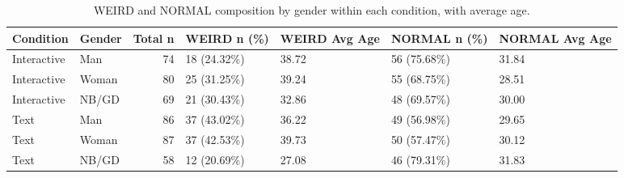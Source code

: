 \begin{table}
\caption{WEIRD and NORMAL composition by gender within each condition, with average age.}
\label{tab:weird-normal-gender-condition}
\begin{tabular}{llrllll}
\toprule
Condition & Gender & Total n & WEIRD n (\%) & WEIRD Avg Age & NORMAL n (\%) & NORMAL Avg Age \\
\midrule
Interactive & Man & 74 & 18 (24.32\%) & 38.72 & 56 (75.68\%) & 31.84 \\
Interactive & Woman & 80 & 25 (31.25\%) & 39.24 & 55 (68.75\%) & 28.51 \\
Interactive & NB/GD & 69 & 21 (30.43\%) & 32.86 & 48 (69.57\%) & 30.00 \\
Text & Man & 86 & 37 (43.02\%) & 36.22 & 49 (56.98\%) & 29.65 \\
Text & Woman & 87 & 37 (42.53\%) & 39.73 & 50 (57.47\%) & 30.12 \\
Text & NB/GD & 58 & 12 (20.69\%) & 27.08 & 46 (79.31\%) & 31.83 \\
\bottomrule
\end{tabular}
\end{table}